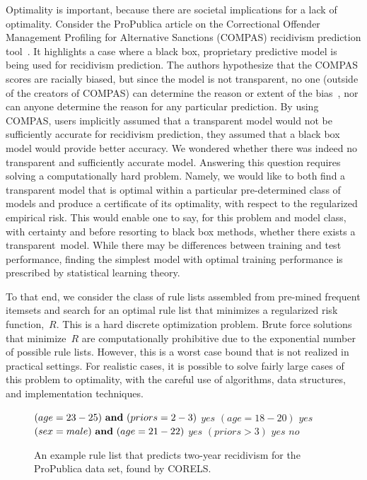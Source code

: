 Optimality is important, because there are societal implications for a lack of optimality.
%
Consider the ProPublica article on the Correctional Offender Management Profiling for Alternative Sanctions
(COMPAS) recidivism prediction tool~\citep{LarsonMaKiAn16}.
%
It highlights a case where a black box, proprietary predictive model is being used for recidivism prediction.
%
The authors hypothesize that the COMPAS scores are racially biased,
but since the model is not transparent, no one (outside of the creators of COMPAS)
can determine the reason or extent of the bias~\citep{LarsonMaKiAn16},
nor can anyone determine the reason for any particular prediction.
%
By using COMPAS, users implicitly assumed that a transparent model
would not be sufficiently accurate for recidivism prediction,
\ie they assumed that a black box model would provide better accuracy.
%
We wondered whether there was indeed no transparent and sufficiently accurate model.
%
Answering this question requires solving a computationally hard problem.
%
Namely, we would like to both find a transparent model that is optimal
within a particular pre-determined class of models
and produce a certificate of its optimality, with respect to the regularized empirical risk.
%
This would enable one to say, for this problem and model class,
with certainty and before resorting to black box methods,
whether there exists a transparent~model.
%
While there may be differences between training and test performance,
finding the simplest model with optimal training performance is prescribed by
statistical learning theory.

To that end, we consider the class of rule lists assembled from pre-mined frequent itemsets
and search for an optimal rule list that minimizes a regularized risk function,~$R$.
%
This is a hard discrete optimization problem.
%
Brute force solutions that minimize~$R$ are computationally prohibitive
due to the exponential number of possible rule lists.
%
However, this is a worst case bound that is not realized in practical settings.
%
For realistic cases, it is possible to solve fairly large cases of this problem to optimality,
with the careful use of algorithms, data structures, and implementation techniques.

\begin{kdd}
\begin{figure}[b!]
\vspace{-3mm}
\begin{algorithmic}
\normalsize
\State \bif $(age=23-25) {\bf ~and~} (priors=2-3)$ \bthen $yes$
\State \belif $(age=18-20)$ \bthen $yes$
\State \belif $(sex=male) {\bf ~and~} (age=21-22)$ \bthen $yes$
\State \belif $(priors>3)$ \bthen $yes$
\State \belse $no$
\end{algorithmic}
\vspace{-3mm}
\caption{An example rule list that predicts two-year recidivism
for the ProPublica data set, found by CORELS.
}
\label{fig:rule-list}
\end{figure}
\end{kdd}

